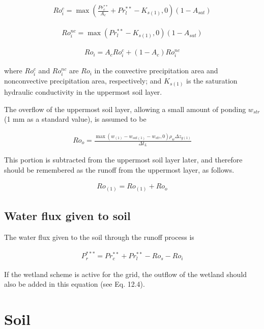 \begin{eqnarray}
Ro_i^c = \max( \frac{Pr_c^{**}}{A_c} + Pr_l^{**} - K_{s(1)}, 0 ) (1 - A_{sat})
 \label{eq284}
\end{eqnarray}

\begin{eqnarray}
Ro_i^{nc} = \max( Pr_l^{\ast\ast} - K_{s(1)}, 0 ) (1 - A_{sat})
 \label{eq285}
\end{eqnarray}

\begin{eqnarray}
Ro_i = A_c Ro_i^c + ( 1 - A_c ) Ro_i^{nc}
 \label{eq286}
\end{eqnarray}

where \(Ro_i^c\) and \(Ro_i^{nc}\) are \(Ro_i\) in the convective precipitation area and nonconvective precipitation area, respectively; and \(K_{s(1)}\) is the saturation hydraulic conductivity in
the uppermost soil layer.

The overflow of the uppermost soil layer, allowing a small amount of ponding \(w_{str}\) (1 mm as a standard value), is assumed to be

\begin{eqnarray}
Ro_o = \frac{\max(w_{(1)} - w_{sat(1)} - w_{str}, 0) \rho_w \Delta z_{g(1)}}{\Delta t_L}
 \label{eq287}
\end{eqnarray}

This portion is subtracted from the uppermost soil layer later, and therefore should be remembered as the runoff from the uppermost layer, as follows.

\begin{eqnarray}
Ro_{(1)} = Ro_{(1)} + Ro_o
 \label{eq288}
\end{eqnarray}

\subsection{Water flux given to soil}\label{water-flux-given-to-soil}

The water flux given to the soil through the runoff process is

\begin{eqnarray}
P_r^{\ast\ast\ast} = Pr^{\ast\ast}_c + Pr^{\ast\ast}_l - Ro_s - Ro_i
 \label{eq293}
\end{eqnarray}

If the wetland scheme is active for the grid, the outflow of the wetland should also be added in this equation (see Eq. 12.4).

\section{Soil}\label{soil}

